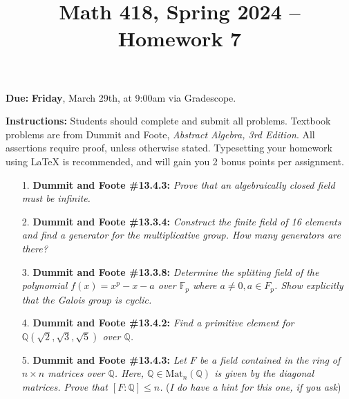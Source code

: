 \documentclass[12pt]{article}
\title{Math 418, Spring 2024 -- Homework 7}
\date{}
\newcommand{\Q}{\mathbb{Q}}
\newcommand{\F}{\mathbb{F}}
\newcommand{\Mat}{\text{Mat}}
\begin{document}
 \maketitle
\vspace{-80pt}

\textbf{Due:} \textbf{Friday}, March 29th, at 9:00am via Gradescope.

\textbf{Instructions:} Students should complete and submit all problems. Textbook problems are from Dummit and Foote, \emph{Abstract Algebra, 3rd Edition}. All assertions require proof, unless otherwise stated. Typesetting your homework using LaTeX is recommended, and will gain you 2 bonus points per assignment.

\begin{enumerate}


\item[1.] \textbf{Dummit and Foote \#13.4.3:} \textit{Prove that an algebraically closed field must be infinite.}

\item[2.] \textbf{Dummit and Foote \#13.3.4:} \textit{Construct the finite field of 16 elements and find a generator for the multiplicative group. How many generators are there?}

\item[3.] \textbf{Dummit and Foote \#13.3.8:} \textit{Determine the splitting field of the polynomial $f(x) = x^p - x - a$ over $\F_p$ where $a\ne 0, a\in F_p$. Show explicitly that the Galois group is cyclic.}

\item[4.] \textbf{Dummit and Foote \#13.4.2:} \textit{Find a primitive element for $\Q(\sqrt{2}, \sqrt{3}, \sqrt{5})$ over $\Q$.}

\item[5.] \textbf{Dummit and Foote \#13.4.3:} \textit{Let $F$ be a field contained in the ring of $n \times n$ matrices over $\Q$. Here, $\Q\in \Mat_n(\Q)$ is given by the diagonal matrices. Prove that $[F : \Q] \le n$.} (\emph{I do have a hint for this one, if you ask})

\end{enumerate}
\end{document}
